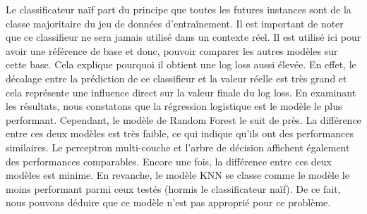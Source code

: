 \documentclass[12pt]{article}
\begin{document}
Le classificateur naïf part du principe que toutes les futures instances sont de la classe majoritaire du jeu de données d'entraînement. 
Il est important de noter que ce classifieur ne sera jamais utilisé dans un contexte réel.
Il est utilisé ici pour avoir une référence de base et donc, pouvoir comparer les autres modèles sur cette base.
Cela explique pourquoi il obtient une log loss aussi élevée.
En effet, le décalage entre la prédiction de ce classifieur et la valeur réelle est très grand et cela représente une influence direct sur la valeur finale du log loss.
\newline\newline 
En examinant les résultats, nous constatons que la régression logistique est le modèle le plus performant. 
Cependant, le modèle de Random Forest le suit de près. 
La différence entre ces deux modèles est très faible, ce qui indique qu'ils ont des performances similaires.
\newline\newline
Le perceptron multi-couche et l'arbre de décision affichent également des performances comparables. 
Encore une fois, la différence entre ces deux modèles est minime.
\newline\newline
En revanche, le modèle KNN se classe comme le modèle le moins performant parmi ceux testés (hormis le classificateur naïf). 
De ce fait, nous pouvons déduire que ce modèle n'est pas approprié pour ce problème.
\end{document}
